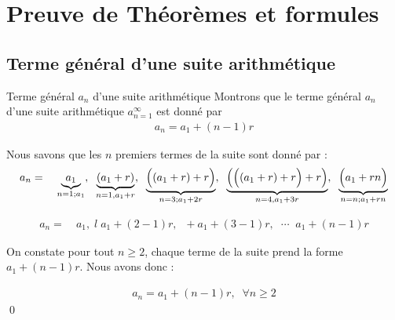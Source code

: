 \documentclass{report}
\begin{document}
\begin{multicols*}{3}


  \end{multicols*}


\chapter{Preuve de Théorèmes et formules}

\section{Terme général d'une suite \textcolor{myb}{\textbf{arithmétique}}}
    \begin{Preuve}{Terme général $a_n$ d'une suite arithmétique}{}
       Montrons que le terme général $a_n$d'une suite arithmétique  
       $a_{n = 1}^{\infty}$ est donné par 
       \begin{align*}
            a_n = a_1 + (n - 1)r
       \end{align*}

       Nous savons que les $n$ premiers termes de la suite sont donné par : 
       \begin{align*}
           a_n = \quad
           \underbrace{a_1}_{n = 1; a_1}, \;\;
           \underbrace{(a_1 + r)}_{n = 1, a_1 + r}, \;\;
           \underbrace{\Bigl((a_1 + r) +r \Bigr)}_{n = 3; a_1 + 2r}, \;\;
           \underbrace{\Bigl(\Bigl( (a_1 + r) + r \Bigr) +r \Bigr)}_{n = 4, a_1 + 3r}, \;\;
           \underbrace{\Bigl(a_1 + rn \Bigr)}_{n = n; a_1 + rn}
       \end{align*}

       \begin{align*}
        a_n = \quad 
        a_1, \;l\; a_1 + (2 -1)r, \;\; + a_1 + (3 - 1)r,\;\;  \cdots \;\; a_1 + (n -1)r
       \end{align*} 


       On constate pour tout $n \geq 2$, chaque terme de la suite prend la forme 
       $a_1 + (n -1)r$. Nous avons donc : 

       \begin{align*}
            \boxed{ 
                a_n = a_1 + (n - 1)r, \;\; \forall n \geq 2
            }   
       \end{align*}         
       \qed
    \end{Preuve}
\end{document}

